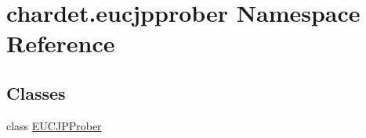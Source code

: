 \hypertarget{namespacechardet_1_1eucjpprober}{}\section{chardet.\+eucjpprober Namespace Reference}
\label{namespacechardet_1_1eucjpprober}
\subsection*{Classes}
\begin{DoxyCompactItemize}
\item 
class \hyperlink{classchardet_1_1eucjpprober_1_1_e_u_c_j_p_prober}{E\+U\+C\+J\+P\+Prober}
\end{DoxyCompactItemize}
